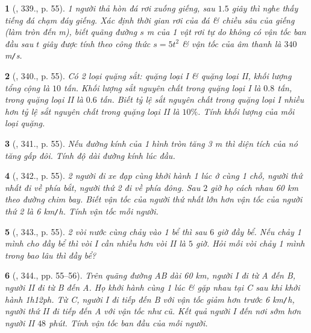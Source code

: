 \documentclass{article}
\newtheorem{baitoan}{}
\begin{document}
\begin{baitoan}[\cite{Binh_Toan_9_tap_2}, 339., p. 55]
	1 người thả hòn đá rơi xuống giếng, sau $1.5$ giây thì nghe thấy tiếng đá chạm đáy giếng. Xác định thời gian rơi của đá \& chiều sâu của giếng (làm tròn đến {\rm m}), biết quãng đường $s$ {\rm m} của 1 vật rơi tự do không có vận tốc ban đầu sau $t$ giây được tính theo công thức $s = 5t^2$ \& vận tốc của âm thanh là $340$ {\rm m{\tt/}s}.
\end{baitoan}

\begin{baitoan}[\cite{Binh_Toan_9_tap_2}, 340., p. 55]
	Có 2 loại quặng sắt: quặng loại I \& quặng loại II, khối lượng tổng cộng là $10$ tấn. Khối lượng sắt nguyên chất trong quặng loại I là $0.8$ tấn, trong quặng loại II là $0.6$ tấn. Biết tỷ lệ sắt nguyên chất trong quặng loại I nhiều hơn tỷ lệ sắt nguyên chất trong quặng loại II là $10\%$. Tính khối lượng của mỗi loại quặng.
\end{baitoan}

\begin{baitoan}[\cite{Binh_Toan_9_tap_2}, 341., p. 55]
	Nếu đường kính của 1 hình tròn tăng {\rm3 m} thì diện tích của nó tăng gấp đôi. Tính độ dài đường kính lúc đầu.
\end{baitoan}

\begin{baitoan}[\cite{Binh_Toan_9_tap_2}, 342., p. 55]
	2 người đi xe đạp cùng khởi hành 1 lúc ở cùng 1 chỗ, người thứ nhất đi về phía bắt, người thứ 2 đi về phía đông. Sau $2$ giờ họ cách nhau {\rm60 km} theo đường chim bay. Biết vận tốc của người thứ nhất lớn hơn vận tốc của người thứ 2 là {\rm6 km{\tt/}h}. Tính vận tốc mỗi người.
\end{baitoan}

\begin{baitoan}[\cite{Binh_Toan_9_tap_2}, 343., p. 55]
	2 vòi nước cùng chảy vào 1 bể thì sau $6$ giờ đầy bể. Nếu chảy 1 mình cho đầy bể thì vòi I cần nhiều hơn vòi II là $5$ giờ. Hỏi mỗi vòi chảy 1 mình trong bao lâu thì đầy bể?
\end{baitoan}

\begin{baitoan}[\cite{Binh_Toan_9_tap_2}, 344., pp. 55--56]
	Trên quãng đường AB dài {\rm60 km}, người I đi từ A đến B, người II đi từ B đến A. Họ khởi hành cùng 1 lúc \& gặp nhau tại C sau khi khởi hành {\rm1h12ph}. Từ C, người I đi tiếp đến B với vận tốc giảm hơn trước {\rm6 km{\tt/}h}, người thứ II đi tiếp đến A với vận tốc như cũ. Kết quả người I đến nơi sớm hơn người II $48$ phút. Tính vận tốc ban đầu của mỗi người.
\end{baitoan}
\end{document}
